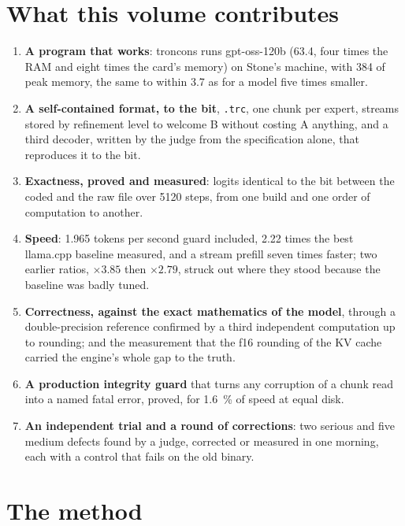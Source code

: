 \section{What this volume contributes}\label{t2i-sec:apports}

\begin{enumerate}
\item \textbf{A program that works}: troncons runs gpt-oss-120b (\SI{63.4}{\Go}, four times the RAM and eight times the card's memory) on Stone's machine, with \SI{384}{\Mo} of peak memory, the same to within \SI{3.7}{\Mo} as for a model five times smaller.
\item \textbf{A self-contained format, to the bit}, \texttt{.trc}, one chunk per expert, streams stored by refinement level to welcome B without costing A anything, and a third decoder, written by the judge from the specification alone, that reproduces it to the bit.
\item \textbf{Exactness, proved and measured}: logits identical to the bit between the coded and the raw file over \num{5120} steps, from one build and one order of computation to another.
\item \textbf{Speed}: \num{1.965} tokens per second guard included, \num{2.22} times the best llama.cpp baseline measured, and a stream prefill seven times faster; two earlier ratios, $\times 3.85$ then $\times 2.79$, struck out where they stood because the baseline was badly tuned.
\item \textbf{Correctness, against the exact mathematics of the model}, through a double-precision reference confirmed by a third independent computation up to rounding; and the measurement that the f16 rounding of the KV cache carried the engine's whole gap to the truth.
\item \textbf{A production integrity guard} that turns any corruption of a chunk read into a named fatal error, proved, for \SI{1.6}{\percent} of speed at equal disk.
\item \textbf{An independent trial and a round of corrections}: two serious and five medium defects found by a judge, corrected or measured in one morning, each with a control that fails on the old binary.
\end{enumerate}

\section{The method}\label{t2i-sec:methode}


